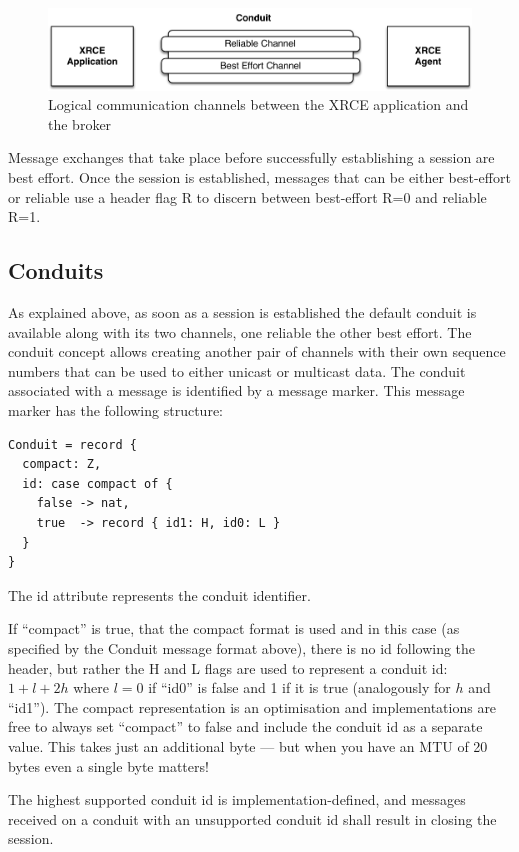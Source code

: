 \documentclass[a4paper,oneside,article]{memoir}
\begin{document}
\begin{figure}
\centering
\includegraphics[scale=0.6]{xrce-conduit.pdf}
\caption{Logical communication channels between the XRCE application and the broker}\label{fig:xrce-conduit}
\end{figure}

Message exchanges that take place before successfully establishing a session are best effort.  Once
the session is established, messages that can be either best-effort or reliable use a header flag R
to discern between best-effort R=0 and reliable R=1.

\subsection{Conduits}

As explained above, as soon as a session is established the default conduit is available along with
its two channels, one reliable the other best effort.  The conduit concept allows creating another
pair of channels with their own sequence numbers that can be used to either unicast or multicast
data.  The conduit associated with a message is identified by a message marker.  This message marker
has the following structure:
\begin{verbatim}
Conduit = record {
  compact: Z,
  id: case compact of {
    false -> nat,
    true  -> record { id1: H, id0: L }
  }
}
\end{verbatim}
The id attribute represents the conduit identifier.

If ``compact'' is true, that the compact format is used and in this case (as specified by the
Conduit message format above), there is no id following the header, but rather the H and L flags are
used to represent a conduit id: $1 + l + 2h$ where $l = 0$ if ``id0'' is false and 1 if it is true
(analogously for $h$ and ``id1'').  The compact representation is an optimisation and
implementations are free to always set ``compact'' to false and include the conduit id as a separate
value.  This takes just an additional byte --- but when you have an MTU of 20 bytes even a single
byte matters!

The highest supported conduit id is implementation-defined, and messages received on a conduit with
an unsupported conduit id shall result in closing the session.
\end{document}
